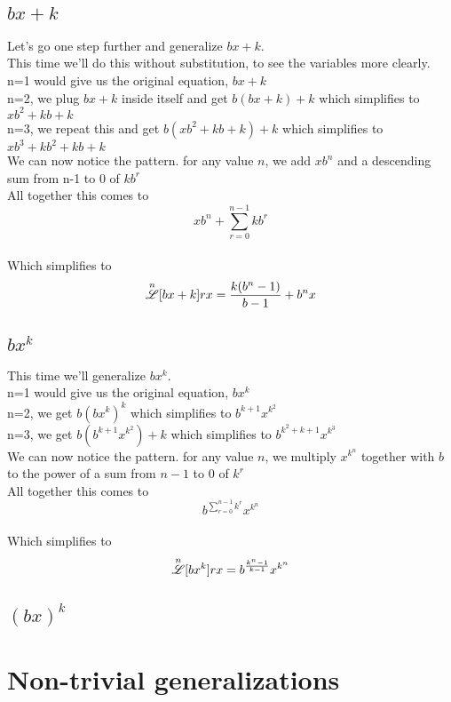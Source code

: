 \documentclass[12pt, letterpaper]{article}
\begin{document}
\subsection{$bx+k$}
Let's go one step further and generalize {$bx+k$}.
\\This time we'll do this without substitution, to see the variables more clearly.
\\n=1 would give us the original equation, {$bx+k$}
\\n=2, we plug {$bx+k$} inside itself and get {$b(bx+k)+k$} which simplifies to {$xb^{2}+kb+k$}
\\n=3, we repeat this and get {$b(xb^{2}+kb+k)+k$} which simplifies to {$xb^{3} + kb^{2} + kb + k$}
\\We can now notice the pattern. for any value {$n$}, we add {$xb^{n}$} and a descending sum from n-1 to 0 of {$kb^{r}$}
\\All together this comes to $$xb^{n}+\sum_{r=0}^{n-1} kb^{r}$$
\\Which simplifies to
$$\overset{n}{\mathscr{L}} [bx+k] rx = \frac{k(b^{n}-1)}{b-1}+b^{n}x$$

\subsection{$bx^k$}
This time we'll generalize {$bx^k$}.
\\n=1 would give us the original equation, {$bx^{k}$}
\\n=2, we get {$b(bx^{k})^{k}$} which simplifies to {$b^{k+1}x^{k^{2}}$}
\\n=3, we get {$b(b^{k+1}x^{k^{2}})+k$} which simplifies to {$b^{k^{2} + k + 1} x^{k^{3}}$}
\\We can now notice the pattern. for any value {$n$}, we multiply {$x^{k^{n}}$} together with {$b$} to the power of a sum from {$n-1$} to {$0$} of {$k^{r}$}
\\All together this comes to $$b^{\sum_{r=0}^{n-1} k^{r}} x^{k^{n}}$$
\\Which simplifies to
$$\overset{n}{\mathscr{L}} [bx^k] rx = b^{\frac{k^{n}-1}{k-1}}x^{k^{n}}$$

\subsection{$(bx)^k$}

\newpage
\section{Non-trivial generalizations}
\end{document}
